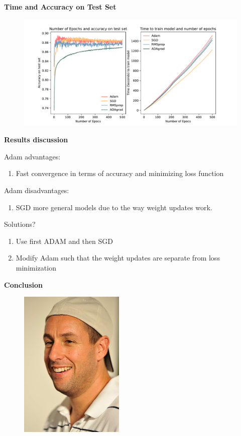 \documentclass{beamer}
\newcommand\myheading[1]{%
  \par\bigskip
  {\Large\bfseries#1}\par\smallskip}
\begin{document}
\begin{frame}
 \myheading{Time and Accuracy on Test Set}
    \begin{figure}[h]
        \includegraphics[width=12cm]{report/figures/time_and_accuracy.pdf}
    \end{figure}
\end{frame}
\begin{frame}
    \myheading{Results discussion}
    Adam advantages:
    \begin{enumerate}
        \item Fast convergence in terms of accuracy and minimizing loss function
    \end{enumerate}
    Adam disadvantages: 
    \begin{enumerate}
        \item SGD more general models due to the way weight updates work. 
    \end{enumerate}
    Solutions? 
    \begin{enumerate}
        \item Use first ADAM and then SGD
        \item Modify Adam such that the weight updates are separate from loss minimization
    \end{enumerate}
\end{frame}

\begin{frame}
    \myheading{Conclusion}
    \begin{figure}[h]
        \includegraphics[width=5cm]{presentation/ADAMS/adam_sandler.jpg}
    \end{figure}
\end{frame}
\end{document}
